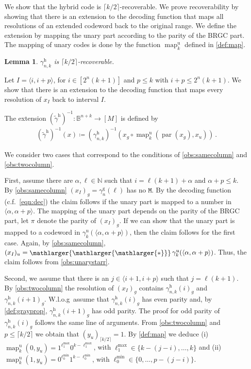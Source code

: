 \documentclass[9pt,journal,compsoc]{IEEEtran}
\newtheorem{lemma}[theorem]{Lemma}
\theoremstyle{remark}
\DeclareMathOperator{\map}{map}
\DeclareMathOperator{\parity}{par}
\newcommand{\bigstarr}{\mathop{\raisebox{-.7pt}{\ensuremath{\mathlarger{\mathlarger{\mathlarger{*}}}}}}}
\newcommand{\mfu}{\mathtt{M}}
\newcommand{\IN}{\mathbb{N}}
\newcommand{\IB}{\mathbb{B}}
\newcommand{\ceil}[1]{\lceil{#1}\rceil}
\newcommand{\ang}[1]{\langle{#1}\rangle}
\newcommand{\intvl}[1]{\ang{#1}}
\newcommand{\gBRGC}[1]{\gamma_{#1}^{\operatorname{g}}}
\newcommand{\gUnary}[1]{\gamma_{#1}^{\operatorname{u}}}
\newcommand{\gtHyb}{(\widetilde{\gamma}^{\operatorname{h}})^{-1}}
\newcommand{\gHyb}[1]{\gamma_{#1}^{\operatorname{h}}}
\newcommand{\mUnary}[1]{\map_{#1}^{\operatorname{u}}}
\newcommand{\lmax}[1]{\ell^{\max}_{#1}}
\newcommand{\lmin}[1]{\ell^{\min}_{#1}}
\begin{document}
We show that the hybrid code is $\ceil{k/2}$-recoverable.
We prove recoverability by showing that there is an extension to the
  decoding function that maps all resolutions of an extended codeword back to
  the original range.
We define the extension by mapping the unary part according to the parity of
  the BRGC part.
The mapping of unary codes is done by the function $\mUnary{k}$ defined in
  \cref{def:map}.

\begin{lemma}\label{lem:recover}
  $\gHyb{n,k}$ is $\ceil{k/2}$-recoverable.
\end{lemma}
\begin{IEEEproof}
  Let $I=\intvl{i,i+p}$, for $i\in[2^{n}(k+1)]$ and $p\leq k$ with $i+p\leq2^n(k+1)$.
  We show that there is an extension to the decoding function that maps every
    resolution of $x_I$ back to interval $I$.

  The extension $\gtHyb\colon\IB^{n+k}\rightarrow[M]$ is defined by
  \begin{align*}
    \gtHyb(x)\coloneqq (\gHyb{n,k})^{-1}(x_g \circ
      \mUnary{k}(\parity(x_g),x_u))\,.
  \end{align*}

  We consider two cases that correspond to the conditions of
    \cref{obs:samecolumn} and \cref{obs:twocolumn}.

  First, assume there are $\alpha,\ell\in\IN$ such that $i=\ell(k+1)+\alpha$
    and $\alpha + p\leq k$.
  By \cref{obs:samecolumn} $(x_I)_g=\gBRGC{n}(\ell)$ has no $\mfu$.
  By the decoding function (c.f.~\eqref{eqn:dec}) the claim follows if the
    unary part is mapped to a number in $\langle\alpha,\alpha+p\rangle$.
  The mapping of the unary part depends on the parity of the BRGC part,
    let $\pi$ denote the parity of $(x_I)_g$.
  If we can show that the unary part is mapped to a codeword in
    $\gUnary{k}(\intvl{\alpha,\alpha+p})$, then the claim
    follows for the first case.
  Again, by \cref{obs:samecolumn},
    $(x_I)_u = \bigstarr\gUnary{k}(\intvl{\alpha,\alpha+p})$.
  Thus, the claim follows from \cref{obs:unarystarr}.

  Second, we assume that there is an $j\in\intvl{i+1,i+p}$ such that $j=\ell(k+1)$.
  By \cref{obs:twocolumn} the resolution of $(x_I)_g$ contains
    $\gHyb{n,k}(i)_g$ and $\gHyb{n,k}(i+1)_g$.
  W.l.o.g\ assume that $\gHyb{n,k}(i)_g$ has even parity and,
    by \cref{def:grayprop}, $\gHyb{n,k}(i+1)_g$ has odd parity.
  The proof for odd parity of $\gHyb{n,k}(i)_g$ follows the
    same line of arguments.
  From \cref{obs:twocolumn} and $p\leq\ceil{k/2}$ we obtain that
    $(y_u)_{\ceil{k/2}}=1$.
  By \cref{def:map} we deduce
    (i) $\mUnary{k}(0,y_u)=1^{\lmax{1}}0^{k-\lmax{1}}$,
    with $\lmax{1}\in\{k-(j-i),\ldots,k\}$ and
    (ii) $\mUnary{k}(1,y_u)=0^{\lmin{0}}1^{k-\lmin{0}}$,
    with $\lmin{0}\in\{0,\ldots,p-(j-i)\}$.


\end{IEEEproof}
\end{document}
